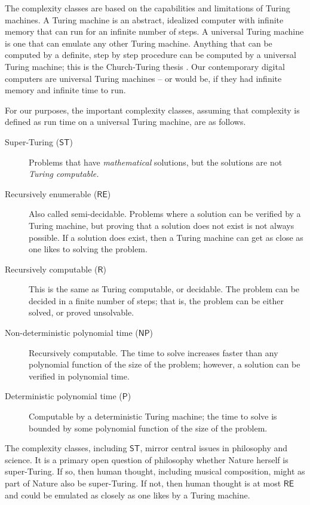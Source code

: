 \documentclass[11pt]{scrartcl}
\begin{document}
 The complexity classes are based on the capabilities and limitations of Turing machines. A Turing machine is an abstract, idealized computer with infinite memory that can run for an infinite number of steps. A universal Turing machine is one that can emulate any other Turing machine. Anything that can be computed by a definite, step by step procedure can be computed by a universal Turing machine; this is the Church-Turing thesis \parencite{sep-church-turing}. Our contemporary digital computers are universal Turing machines -- or would be, if they had infinite memory and infinite time to run.
 
 For our purposes, the important complexity classes, assuming that complexity is defined as run time on a universal Turing machine, are as follows.

\begin{description}
\item[Super-Turing ($\mathsf{ST}$)] Problems that have \emph{mathematical} solutions, but the solutions are not \emph{Turing computable.} 
\item[Recursively enumerable ($\mathsf{RE}$)] Also called semi-decidable. Problems where a solution can be verified by a Turing machine, but proving that a solution does not exist is not always possible. If a solution does exist, then a Turing machine can get as close as one likes to solving the problem.
\item[Recursively computable ($\mathsf{R}$)] This is the same as Turing computable, or decidable. The problem can be decided in a finite number of steps; that is, the problem can be either solved, or proved unsolvable.
\item[Non-deterministic polynomial time ($\mathsf{NP}$)] Recursively computable. The time to solve increases faster than any polynomial function of the size of the problem; however, a solution can be verified in polynomial time.
\item[Deterministic polynomial  time ($\mathsf{P}$)] Computable by a deterministic Turing machine; the time to solve is bounded by some polynomial function of the size of the problem.
\end{description}

The complexity classes, including $\mathsf{ST}$, mirror central issues in philosophy and science. It is a primary open question of philosophy whether Nature herself is super-Turing. If so, then human thought, including musical composition, might as part of Nature also be super-Turing. If not, then human thought is at most $\mathsf{RE}$ and could be emulated as closely as one likes by a Turing machine. 
\end{document}
